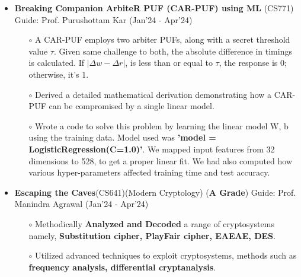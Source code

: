 \documentclass[10.8pt, a4paper]{extarticle}
\begin{document}
\begin{itemize}
  \item \textbf{Breaking Companion ArbiteR PUF (CAR-PUF) using ML} (CS771) Guide: Prof. Purushottam Kar \href{https://github.com/souvikcseiitk/Companion-Arbiter-PUF-broken-by-ML-attacks}{\faGithub{}} \hfill(Jan'24 - Apr'24)
	\\[-0.6cm]
	\begin{itemize}
 
         \item[$\circ$] A CAR-PUF employs two arbiter PUFs, along with a secret threshold value $\tau$. Given same challenge to both, the absolute difference in timings is calculated. If $|\Delta w - \Delta r|$, is less than or equal to $\tau$, the response is 0; otherwise, it's 1.
 \\[-0.6cm]
         
        \item[$\circ$] Derived a detailed mathematical derivation demonstrating how a CAR-PUF can be compromised by a single linear model. \\[-0.6cm]

         \item[$\circ$] Wrote a code to solve this problem by learning the linear model W, b using the training data. Model used was \textbf{'model = LogisticRegression(C=1.0)'}. We mapped input features from 32 dimensions to 528, to get a proper linear fit. We had also computed how various hyper-parameters affected training time and test accuracy.
 
	

	\end{itemize}
\vspace{2pt}

\item \textbf{Escaping the Caves}(CS641)(Modern Cryptology) 
 (\textbf{A Grade}) Guide: Prof. Manindra Agrawal \href{https://github.com/souvikcseiitk/Escaping-the-Caves}{\faGithub{}} \hfill(Jan'24 - Apr'24)
    \\[-0.6cm]
	\begin{itemize}
	      \item [$\circ$] Methodically \textbf {Analyzed and Decoded} a range of cryptosystems namely, \textbf {Substitution cipher, PlayFair cipher, EAEAE,  DES}.\\[-0.6cm]
	      
	      \item [$\circ$] Utilized advanced techniques to exploit cryptosystems, methods such as\textbf { frequency analysis, differential cryptanalysis}.\\[-0.6cm]
	\end{itemize}
\end{itemize}
\vspace{2pt}
\end{document}
